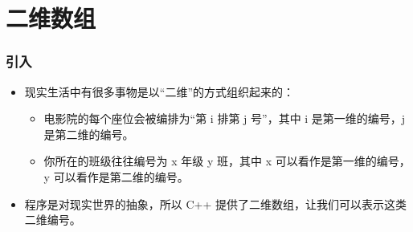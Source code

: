 \section{二维数组}

\begin{frame}[fragile]
    \frametitle{引入}

    \begin{itemize}[<+->]
        \item 现实生活中有很多事物是以“二维”的方式组织起来的：

            \begin{itemize}
                \item 电影院的每个座位会被编排为“第 i 排第 j 号”，其中 i 是第一维的编号，j 是第二维的编号。
                \item 你所在的班级往往编号为 x 年级 y 班，其中 x 可以看作是第一维的编号，y 可以看作是第二维的编号。
            \end{itemize}

        \item 程序是对现实世界的抽象，所以 C++ 提供了二维数组，让我们可以表示这类二维编号。
    \end{itemize}
\end{frame}

